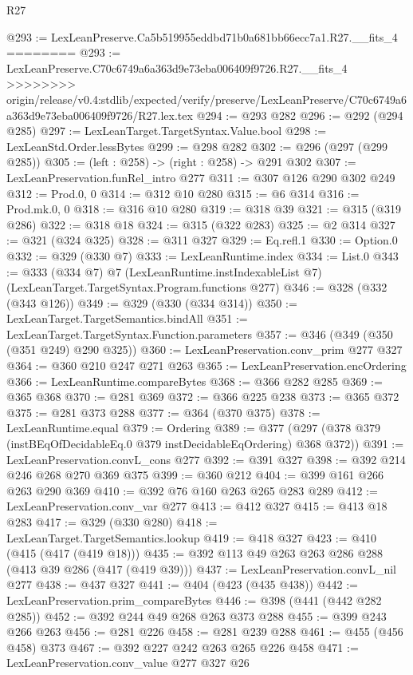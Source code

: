 \begin{lexlean}{R27}
\begin{coremodule}
{{{{{{{{{{{@293 := LexLeanPreserve.Ca5b519955eddbd71b0a681bb66ecc7a1.R27.__fits_4
========
@293 := LexLeanPreserve.C70c6749a6a363d9e73eba006409f9726.R27.__fits_4
>>>>>>>> origin/release/v0.4:stdlib/expected/verify/preserve/LexLeanPreserve/C70c6749a6a363d9e73eba006409f9726/R27.lex.tex
@294 := @293 @282
@296 := @292 (@294 @285)
@297 := LexLeanTarget.TargetSyntax.Value.bool
@298 := LexLeanStd.Order.lessBytes
@299 := @298 @282
@302 := @296 (@297 (@299 @285))
@305 := (left : @258) -> (right : @258) -> @291 @302
@307 := LexLeanPreservation.funRel_intro @277
@311 := @307 @126 @290 @302 @249
@312 := Prod.{0, 0}
@314 := @312 @10 @280
@315 := @6 @314
@316 := Prod.mk.{0, 0}
@318 := @316 @10 @280
@319 := @318 @39
@321 := @315 (@319 @286)
@322 := @318 @18
@324 := @315 (@322 @283)
@325 := @2 @314
@327 := @321 (@324 @325)
@328 := @311 @327
@329 := Eq.refl.{1}
@330 := Option.{0}
@332 := @329 (@330 @7)
@333 := LexLeanRuntime.index
@334 := List.{0}
@343 := @333
    (@334 @7)
    @7
    (LexLeanRuntime.instIndexableList @7)
    (LexLeanTarget.TargetSyntax.Program.functions @277)
@346 := @328 (@332 (@343 @126))
@349 := @329 (@330 (@334 @314))
@350 := LexLeanTarget.TargetSemantics.bindAll
@351 := LexLeanTarget.TargetSyntax.Function.parameters
@357 := @346 (@349 (@350 (@351 @249) @290 @325))
@360 := LexLeanPreservation.conv_prim @277 @327
@364 := @360 @210 @247 @271 @263
@365 := LexLeanPreservation.encOrdering
@366 := LexLeanRuntime.compareBytes
@368 := @366 @282 @285
@369 := @365 @368
@370 := @281 @369
@372 := @366 @225 @238
@373 := @365 @372
@375 := @281 @373 @288
@377 := @364 (@370 @375)
@378 := LexLeanRuntime.equal
@379 := Ordering
@389 := @377 (@297 (@378 @379 (instBEqOfDecidableEq.{0} @379 instDecidableEqOrdering) @368 @372))
@391 := LexLeanPreservation.convL_cons @277
@392 := @391 @327
@398 := @392 @214 @246 @268 @270 @369 @375
@399 := @360 @212
@404 := @399 @161 @266 @263 @290 @369
@410 := @392 @76 @160 @263 @265 @283 @289
@412 := LexLeanPreservation.conv_var @277
@413 := @412 @327
@415 := @413 @18 @283
@417 := @329 (@330 @280)
@418 := LexLeanTarget.TargetSemantics.lookup
@419 := @418 @327
@423 := @410 (@415 (@417 (@419 @18)))
@435 := @392 @113 @49 @263 @263 @286 @288 (@413 @39 @286 (@417 (@419 @39)))
@437 := LexLeanPreservation.convL_nil @277
@438 := @437 @327
@441 := @404 (@423 (@435 @438))
@442 := LexLeanPreservation.prim_compareBytes
@446 := @398 (@441 (@442 @282 @285))
@452 := @392 @244 @49 @268 @263 @373 @288
@455 := @399 @243 @266 @263
@456 := @281 @226
@458 := @281 @239 @288
@461 := @455 (@456 @458) @373
@467 := @392 @227 @242 @263 @265 @226 @458
@471 := LexLeanPreservation.conv_value @277 @327 @26
}}}}}}}}}}}
\end{coremodule}
\end{lexlean}
